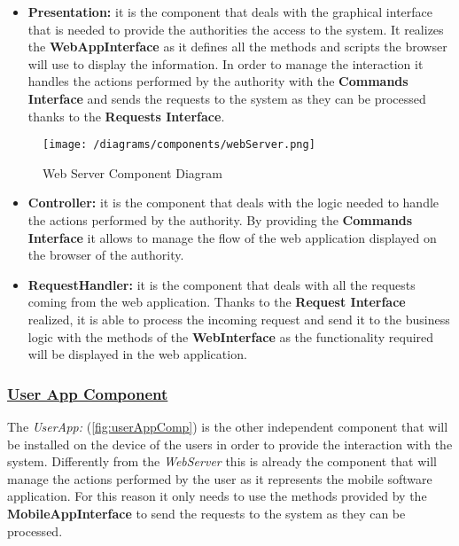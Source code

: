 			\begin{itemize}
				\item \textbf{Presentation:} it is the component that deals with the graphical interface that is needed to provide the authorities the access to the system. It realizes the \textbf{WebAppInterface} as it defines all the methods and scripts the browser will use to display the information. In order to manage the interaction it handles the actions performed by the authority with the \textbf{Commands Interface} and sends the requests to the system as they can be processed thanks to the \textbf{Requests Interface}.
			\end{itemize}
			
				\begin{figure}[ht]
					\centering
					\texttt{[image: /diagrams/components/webServer.png]}
					\caption{\label{fig:webServerComp} Web Server Component Diagram}
				\end{figure}
		
			\begin{itemize}
				\item \textbf{Controller:} it is the component that deals with the logic needed to handle the actions performed by the authority. By providing the \textbf{Commands Interface} it allows to manage the flow of the web application displayed on the browser of the authority.
				
				\item \textbf{RequestHandler:} it is the component that deals with all the requests coming from the web application. Thanks to the \textbf{Request Interface} realized, it is able to process the incoming request and send it to the business logic with the methods of the \textbf{WebInterface} as the functionality required will be displayed in the web application.
			\end{itemize}
		
		\subsubsection[User App Component]{\hyperlink{toc}{User App Component}}
			\label{sec:userAppComponent}
			
			The \emph{UserApp:} (\autoref{fig:userAppComp}) is the other independent component that will be installed on the device of the users in order to provide the interaction with the system. Differently from the \emph{WebServer} this is already the component that will manage the actions performed by the user as it represents the mobile software application. For this reason it only needs to use the methods provided by the \textbf{MobileAppInterface} to send the requests to the system as they can be processed.\\
			
